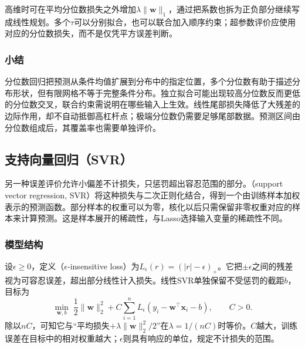 高维时可在平均分位数损失之外增加$\lambda\lVert\bm{w}\rVert_1$，通过把系数也拆为正负部分继续写成线性规划。多个$\tau$可以分别拟合，也可以联合加入顺序约束；超参数评价应使用对应的分位数损失，而不是仅凭平方误差判断。

\subsubsection{小结}

分位数回归把预测从条件均值扩展到分布中的指定位置，多个分位数有助于描述分布形状，但有限网格不等于完整条件分布。独立拟合可能出现较高分位数反而更低的分位数交叉，联合约束需说明在哪些输入上生效。线性尾部损失降低了大残差的边际作用，却不自动抵御高杠杆点；极端分位数仍需要足够尾部数据。预测区间由分位数组成后，其覆盖率也需要单独评价。

\subsection{支持向量回归（SVR）}
\label{sec:regression-svr}

另一种误差评价允许小偏差不计损失，只惩罚超出容忍范围的部分。（support vector regression, SVR）将这种损失与二次正则化结合，得到一个由训练样本加权表示的预测函数。部分样本的权重可以为零，核化以后只需保留非零权重对应的样本来计算预测。这是样本展开的稀疏性，与Lasso选择输入变量的稀疏性不同。

\subsubsection{模型结构}

设$\epsilon\geq0$，定义（$\epsilon$-insensitive loss）为$L_\epsilon(r)=(|r|-\epsilon)_+$。它把$\pm\epsilon$之间的残差视为可容忍误差，超出部分线性计入损失。线性SVR单独保留不受惩罚的截距$b$，目标为
\begin{equation}
  \min_{\bm{w},b}\;
    \frac12\lVert\bm{w}\rVert_2^2+
    C\sum_{i=1}^{n}L_\epsilon(y_i-\bm{w}^{\top}\bm{x}_i-b),
    \qquad C>0.
  \label{eq:regression-svr-objective}
\end{equation}
除以$nC$，可知它与“平均损失$+\lambda\lVert\bm{w}\rVert_2^2/2$”在$\lambda=1/(nC)$时等价。$C$越大，训练误差在目标中的相对权重越大；$\epsilon$则具有响应的单位，规定不计损失的范围。


